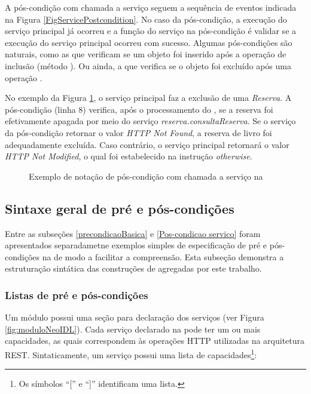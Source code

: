 A pós-condição com chamada a serviço seguem a sequência de eventos indicada na
Figura \ref{FigServicePostcondition}. No caso da pós-condição, a execução do
serviço principal já ocorreu e a função do serviço na pós-condição é validar se
a execução do serviço principal ocorreu com sucesso. Algumas pós-condições são
naturais, como as que verificam se um objeto foi inserido após a operação de
inclusão (método ). Ou ainda, a que verifica se o objeto foi excluído
após uma operação .

No exemplo da Figura \ref{lst:DBCPosCondServico}, o serviço principal faz a
exclusão de uma \textit{Reserva}. A pós-condição (linha 8) verifica, após
o processamento do , se a reserva foi efetivamente apagada por
meio do serviço \emph{reserva.consultaReserva}. Se o serviço da pós-condição retornar o valor
\emph{HTTP Not Found}, a reserva de livro foi adequadamente excluída. Caso
contrário, o serviço principal retornará o valor \emph{HTTP Not Modified}, o qual foi
estabelecido na instrução \textit{otherwise}.

\begin{figure}[htb] 
\begin{small} 

\end{small}
\caption{Exemplo de notação de pós-condição com chamada a serviço na
\neoidl{}}
\label{lst:DBCPosCondServico}  	
\end{figure} 


\subsection{Sintaxe geral de pré e pós-condições}
\label{SintaxeGeralDbc}

Entre as subseções \ref{precondicaoBasica} e \ref{Pos-condicao servico} foram
apresentados separadametne exemplos simples de especificação de pré e
pós-condições na \neoidl{} de modo a facilitar a compreensão. Esta subseção
demonstra a estruturação sintática das construções de \designbycontract{} agregadas \neoidl{} por este trabalho.

\subsubsection{Listas de pré e pós-condições}

Um módulo \neoidl{} possui uma seção para declaração dos serviços (ver Figura
\ref{fig:moduloNeoIDL}). Cada serviço declarado na \neoidl{} pode ter um ou mais
capacidades, as quais correspondem às operações HTTP utilizadas na arquitetura
REST. Sintaticamente, um serviço possui uma lista de capacidades\footnote{Os
símbolos ``['' e ``]'' identificam uma lista.}:

